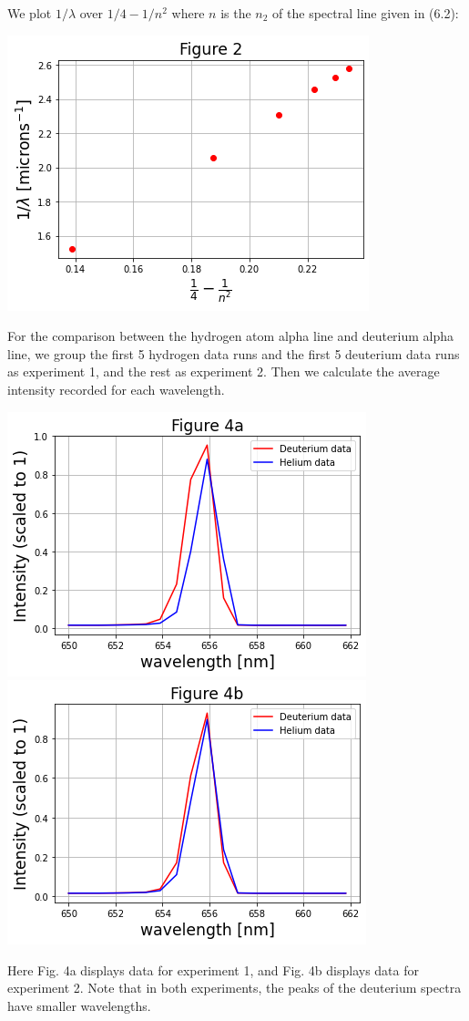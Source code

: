 \documentclass[11pt]{book}
\theoremstyle{break}
\theoremstyle{break}
\begin{document}
We plot $1/\lambda$ over $1/4 - 1/n^2$ where $n$ is the $n_2$ of the spectral line given in (6.2):
\begin{center}
\includegraphics[scale=0.55]{2}
\end{center}


For the comparison between the hydrogen atom alpha line and deuterium alpha line, we group the first 5 hydrogen data runs and the first 5 deuterium data runs as experiment 1, and the rest as experiment 2. Then we calculate the average intensity recorded for each wavelength. 
\begin{center}
\includegraphics[scale=0.55]{4a}
\includegraphics[scale=0.55]{4b}
\end{center}
Here Fig. 4a displays data for experiment 1, and Fig. 4b displays data for experiment 2. Note that in both experiments, the peaks of the deuterium spectra have smaller wavelengths.\\
\end{document}
